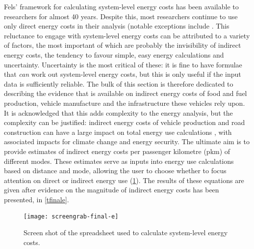 Fels' framework for calculating system-level energy costs has been available
to researchers for almost 40 years. Despite this, most researchers
continue to use only direct energy
costs in their analysis (notable exceptions include
\citep{Treloar2004, Lenzen1999, MacKay2009, Lovelace2011-assessing}. %
This reluctance to engage with system-level energy
costs can be attributed to a variety of factors, the most important
of which are probably the invisibility of indirect energy costs,
the tendency to favour simple, easy energy calculations and uncertainty.
Uncertainty is the most critical of these: it is fine to have formulae
that \emph{can} work out
system-level energy costs, but this is only useful if the input data is
sufficiently reliable. The bulk of this section is therefore dedicated
to describing the evidence that is available on indirect energy costs of food
and fuel production, vehicle manufacture and the infrastructure these
vehicles rely upon. It is acknowledged that this adds complexity to the energy
analysis, but the complexity can be justified: indirect
energy costs of vehicle production and road construction can have a large
impact on total energy use calculations
\citep{Lovelace2011-assessing, Lenzen1999, Wee2000}, with associated impacts
for climate change and energy security. The ultimate aim is to provide
estimates of indirect energy costs per passenger kilometre (pkm) of
different modes. These estimates serve as inputs into energy use
calculations based on distance and mode, allowing the user to choose whether
to focus attention on direct or indirect energy use (\cref{screengrab-final-e}).
The results of these equations are given after evidence on
the magnitude of indirect energy costs has been presented, in \cref{tfinale}.

\begin{figure}[t]
 \begin{center}
 \texttt{[image: screengrab-final-e]}
\end{center}
 \caption{Screen shot of the spreadsheet used to calculate system-level energy
 costs.}
 \label{screengrab-final-e}
\end{figure}


